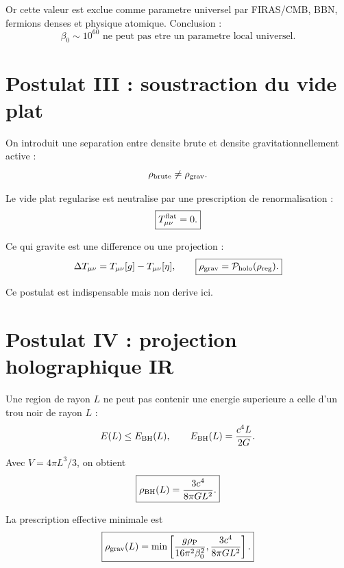 \documentclass[11pt,a4paper]{article}
\newcommand{\rp}{\rho_{\rm P}}
\newcommand{\rhoreg}{\rho_{\rm reg}}
\newcommand{\rhograv}{\rho_{\rm grav}}
\begin{document}
Or cette valeur est exclue comme parametre universel par FIRAS/CMB, BBN,
fermions denses et physique atomique. Conclusion :
\begin{equation}
\boxed{
\beta_0\sim10^{60}\text{ ne peut pas etre un parametre local universel.}
}
\end{equation}

\section{Postulat III : soustraction du vide plat}

On introduit une separation entre densite brute et densite gravitationnellement
active :
\begin{equation}
\rho_{\rm brute}\neq \rhograv.
\end{equation}

Le vide plat regularise est neutralise par une prescription de renormalisation :
\begin{equation}
\boxed{T_{\mu\nu}^{\rm flat}=0.}
\end{equation}

Ce qui gravite est une difference ou une projection :
\begin{equation}
\Delta T_{\mu\nu}=T_{\mu\nu}[g]-T_{\mu\nu}[\eta],
\qquad
\boxed{
\rhograv=\mathcal P_{\rm holo}(\rhoreg).
}
\end{equation}

Ce postulat est indispensable mais non derive ici.

\section{Postulat IV : projection holographique IR}

Une region de rayon \(L\) ne peut pas contenir une energie superieure a celle
d'un trou noir de rayon \(L\) :
\begin{equation}
E(L)\leq E_{\rm BH}(L),
\qquad
E_{\rm BH}(L)=\frac{c^4L}{2G}.
\end{equation}

Avec \(V=4\pi L^3/3\), on obtient
\begin{equation}
\boxed{
\rho_{\rm BH}(L)=\frac{3c^4}{8\pi GL^2}.
}
\end{equation}

La prescription effective minimale est
\begin{equation}
\boxed{
\rhograv(L)=
\min\left[
\frac{g\rp}{16\pi^2\beta_0^2},
\frac{3c^4}{8\pi GL^2}
\right].
}
\end{equation}
\end{document}

